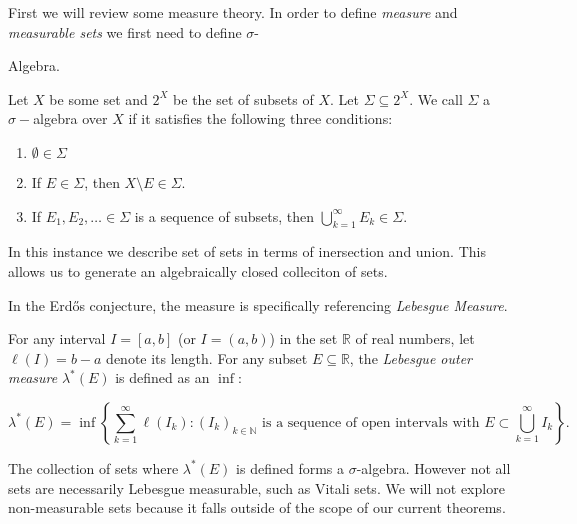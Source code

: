 First we will review some measure theory.  In order to define \textit{measure} and \textit{measurable sets} we first need to define $\sigma$\hyphen{Algebra.   



\begin{definition}
    Let $X$ be some set and $2^X$ be the set of subsets of $X$. Let $\Sigma \subseteq 2^X$. We call $\Sigma$ a $\sigma-$algebra over $X$ if it satisfies the following three conditions:
    \begin{enumerate}
        \item $\emptyset \in \Sigma$
        \item If $E \in \Sigma$, then $X\setminus E \in \Sigma$. 
        \item If $E_1, E_2, \dots \in \Sigma$ is a sequence of subsets, then $\bigcup_{k=1}^\infty E_k \in \Sigma$. 
    \end{enumerate}
\end{definition}

In this instance we describe set of sets in terms of inersection and union.  This allows us to generate an algebraically closed colleciton of sets.  

In the Erd\H{o}s conjecture, the measure is specifically referencing \textit{Lebesgue Measure}.

\begin{definition}
    For any interval $I = [a,b]$ (or $I = (a, b)$) in the set $\mathbb{R}$ of real numbers, let $\ell(I)= b - a$ denote its length. For any subset $E\subseteq\mathbb{R}$, the \textit{Lebesgue outer measure} $\lambda^*(E)$ is defined as an $\inf:$ 
    
    $$\lambda^*(E) = \inf \left\{\sum_{k=1}^\infty \ell(I_k) : {(I_k)_{k \in \mathbb N}} \text{ is a sequence of open intervals with } E\subset \bigcup_{k=1}^\infty I_k\right\}.$$
\end{definition}

The collection of sets where $\lambda^*(E)$ is defined forms a $\sigma$\hyphen{algebra}.  However not all sets are necessarily Lebesgue measurable, such as Vitali sets.  We will not explore non-measurable sets because it falls outside of the scope of our current theorems.


}
